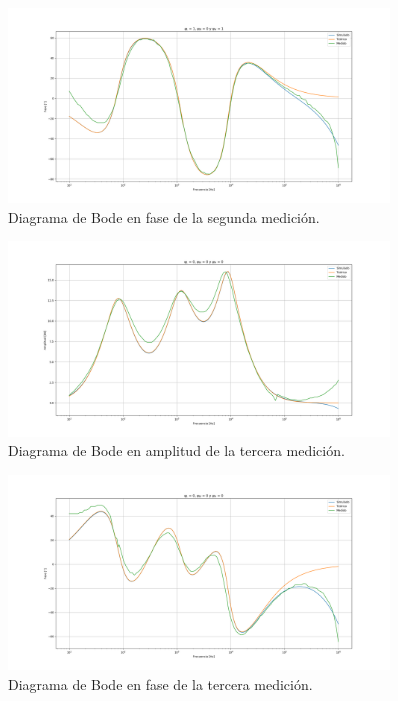 \begin{figure}[H]	
	\centering
	\includegraphics[width=0.9\textwidth]{Imagenes/CBodes-Ph-2.png}
	\caption{Diagrama de Bode en fase de la segunda medición.}
	\label{fig:CBodes-Ph-2}
\end{figure}
\begin{figure}[H]	
	\centering
	\includegraphics[width=0.9\textwidth]{Imagenes/CBodes-Mod-3.png}
	\caption{Diagrama de Bode en amplitud de la tercera medición.}
	\label{fig:CBodes-Mod-3}
\end{figure}
\begin{figure}[H]	
	\centering
	\includegraphics[width=0.9\textwidth]{Imagenes/CBodes-Ph-3.png}
	\caption{Diagrama de Bode en fase de la tercera medición.}
	\label{fig:CBodes-Ph-3}
\end{figure}
